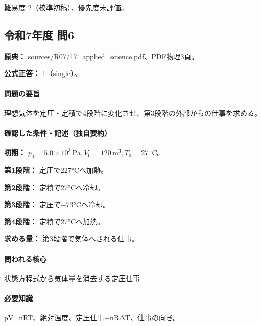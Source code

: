 \par 難易度 2（校準初稿）、優先度未評価。

\subsection{令和7年度 問6}
\label{q:r07-reg-applied-06}

\noindent\textbf{原典：} sources/R07/17\_applied\_science.pdf、PDF物理3頁。

\textbf{公式正答：} 1（single）。

\paragraph{問題の要旨} 理想気体を定圧・定積で4段階に変化させ、第3段階の外部からの仕事を求める。

\paragraph{確認した条件・記述（独自要約）}\mbox{}\par

\noindent\textbf{初期：} \(p_0=5.0\times10^3\,\mathrm{Pa},V_0=120\,\mathrm{m}^3,T_0=27\,{}^\circ\mathrm{C}\)。\par

\noindent\textbf{第1段階：} 定圧で227°Cへ加熱。\par

\noindent\textbf{第2段階：} 定積で27°Cへ冷却。\par

\noindent\textbf{第3段階：} 定圧で−73°Cへ冷却。\par

\noindent\textbf{第4段階：} 定積で27°Cへ加熱。\par

\noindent\textbf{求める量：} 第3段階で気体へされる仕事。\par

\paragraph{問われる核心} 状態方程式から気体量を消去する定圧仕事

\paragraph{必要知識} pV=\allowbreak{}nRT、絶対温度、定圧仕事−nRΔT、仕事の向き。

